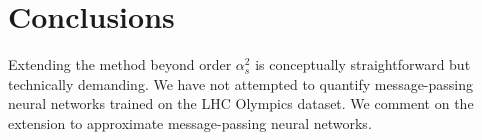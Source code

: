 \section{Conclusions}\label{sec:conclusions}

Extending the method beyond order $\alpha_s^2$ is conceptually
straightforward but technically demanding. We have not attempted to
quantify message-passing neural networks trained on the LHC Olympics
dataset. We comment on the extension to approximate message-passing
neural networks.

